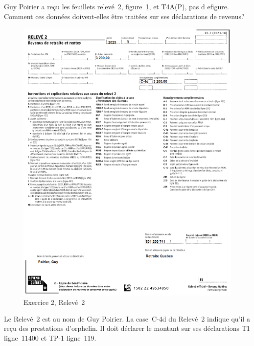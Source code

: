 \begin{question}
	Guy Poirier a reçu les feuillets relevé~2, figure~\ref{fig:chap7Exercice2RL2}, et T4A(P), pas d efigure. Comment ces données doivent-elles être traitées sur ses déclarations de revenus?
	\begin{figure}
		\centering
		\includegraphics[width=.9\textwidth]{exercice/7-2/Q2/RL2.png}
		\caption[]{Exercice 2, Relevé~2}
		\label{fig:chap7Exercice2RL2}
	\end{figure}
\end{question}
Le Relevé~2 est au nom de Guy Poirier. La case~C-4d du Relevé~2 indique qu'il a reçu des prestations d'orphelin. Il doit déclarer le montant sur ses déclarations T1 ligne~11400 et TP-1 ligne~119.


